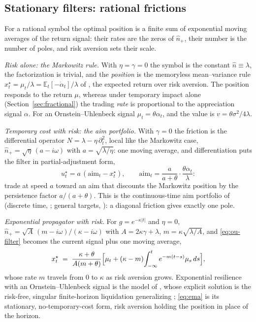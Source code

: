 \documentclass[11pt]{article}
\newcommand{\E}{\mathbb{E}}
\theoremstyle{plain}
\theoremstyle{definition}
\theoremstyle{remark}
\begin{document}
\subsection{Stationary filters: rational frictions}\label{sec:rational}

For a rational symbol the optimal position is a finite sum of exponential moving averages of the return signal: their rates are the zeros of $\hat n_+$, their number is the number of poles, and risk aversion sets their scale.

\emph{Risk alone: the Markowitz rule.} With $\eta=\gamma=0$ the symbol is the constant $\hat n\equiv\lambda$, the factorization is trivial, and the \emph{position} is the memoryless mean--variance rule $x^\star_t=\mu_t/\lambda=\E_t[-\dot\alpha_t]/\lambda$ of \citet{Markowitz1952,Merton1971}, the expected return over risk aversion. The position responds to the return $\mu$, whereas under temporary impact alone (Section~\ref{sec:fractional}) the trading \emph{rate} is proportional to the appreciation signal $\alpha$. For an Ornstein--Uhlenbeck signal $\mu_t=\theta\alpha_t$, and the value is $v=\theta\sigma^2/4\lambda$.

\emph{Temporary cost with risk: the aim portfolio.} With $\gamma=0$ the friction is the differential operator $N=\lambda-\eta\,\partial_t^2$, local like the Markowitz case, $\hat n_+=\sqrt\eta\,(a-i\omega)$ with $a=\sqrt{\lambda/\eta}$: one moving average, and differentiation puts the filter in partial-adjustment form,
\begin{equation}\label{eq:gp}
u^\star_t = a\,(\mathrm{aim}_t - x^\star_t), \qquad
\mathrm{aim}_t = \frac{a}{a+\theta}\cdot\frac{\theta\alpha_t}{\lambda}:
\end{equation}
trade at speed $a$ toward an aim that discounts the Markowitz position by the persistence factor $a/(a+\theta)$. This is the continuous-time aim portfolio of \citet{GarleanuPedersen2016} (discrete time, \citet{GarleanuPedersen2013}; general targets, \citet{BankSonerVoss2017}): a diagonal friction gives exactly one pole.

\emph{Exponential propagator with risk.} For $g=e^{-\kappa|t|}$ and $\eta=0$, $\hat n_+=\sqrt A\,(m-i\omega)/(\kappa-i\omega)$ with $A=2\kappa\gamma+\lambda$, $m=\kappa\sqrt{\lambda/A}$, and \eqref{eq:ou-filter} becomes the current signal plus one moving average,
\begin{equation}\label{eq:ema}
x^\star_t \;=\; \frac{\kappa+\theta}{A(m+\theta)}\Bigl[\mu_t + (\kappa-m)\!\int_{-\infty}^t e^{-m(t-s)}\mu_s\,ds\Bigr],
\end{equation}
whose rate $m$ travels from $0$ to $\kappa$ as risk aversion grows. Exponential resilience with an Ornstein--Uhlenbeck signal is the model of \citet{LehalleNeuman2019}, whose explicit solution is the risk-free, singular finite-horizon liquidation generalizing \citet{ObizhaevaWang2013}; \eqref{eq:ema} is its stationary, no-temporary-cost form, risk aversion holding the position in place of the horizon.
\end{document}

